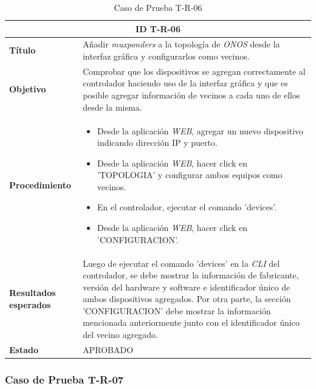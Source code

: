 \begin{table}[H]
  \centering
  \begin{tabular}{ |m{2.5cm}|m{11.5cm}|  }
  \hline
  \multicolumn{2}{|c|}{ \textbf{ID T-R-06} } \\
  \hline
  \centering
  \textbf{Título} & Añadir \textit{muxponders} a la topología de \textit{ONOS} desde la interfaz gráfica y configurarlos como vecinos.  \\
  \hline
  \centering
  \textbf{Objetivo} & Comprobar que los dispositivos se agregan correctamente al controlador haciendo uso de la interfaz gráfica y que es posible agregar información de vecinos a cada uno de ellos desde la misma.   \\
  \hline
  \centering
  \textbf{Procedimiento} & \begin{itemize}
    \item Desde la aplicación \textit{WEB}, agregar un nuevo dispositivo indicando dirección IP y puerto.
    \item Desde la aplicación \textit{WEB}, hacer click en 'TOPOLOGIA' y configurar ambos equipos como vecinos.
    \item En el controlador, ejecutar el comando 'devices'.
    \item Desde la aplicación \textit{WEB}, hacer click en 'CONFIGURACION'.
  \end{itemize}     \\
  \hline
  \centering
  \textbf{Resultados esperados} & 
  Luego de ejecutar el comando 'devices' en la \textit{CLI} del controlador, se debe mostrar la información de fabricante, versión del hardware y software e identificador único de ambos dispositivos agregados. 
Por otra parte, la sección 'CONFIGURACION' debe mostrar la información mencionada anteriormente junto con el identificador único del vecino agregado. 
  
    \\
  
    \hline
  \centering
    \textbf{Estado}    & APROBADO  \\
  \hline
  \end{tabular}
  
  \caption{Caso de Prueba T-R-06}
  \label{tab:TR06}
  \end{table}



  \subsubsection{Caso de Prueba T-R-07}

